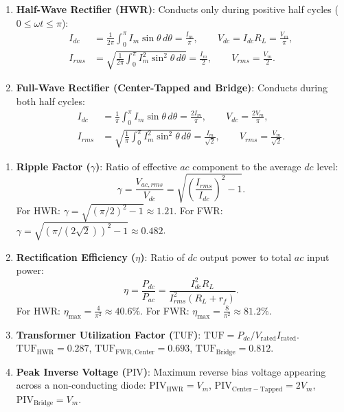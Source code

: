 \documentclass[12pt,a4paper]{article}
\begin{document}
\begin{enumerate}[leftmargin=1.5em, itemsep=3pt]
  \item \textbf{Half-Wave Rectifier (HWR)}: Conducts only during positive half cycles ($0 \le \omega t \le \pi$):
  \[
  \begin{aligned}
  I_{dc} &= \frac{1}{2\pi}\int_0^\pi I_m\sin\theta\,d\theta = \frac{I_m}{\pi},\qquad V_{dc} = I_{dc}R_L = \frac{V_m}{\pi},\\
  I_{rms} &= \sqrt{\frac{1}{2\pi}\int_0^\pi I_m^2\sin^2\theta\,d\theta} = \frac{I_m}{2},\qquad V_{rms} = \frac{V_m}{2}.
  \end{aligned}
  \]
  \item \textbf{Full-Wave Rectifier (Center-Tapped and Bridge)}: Conducts during both half cycles:
  \[
  \begin{aligned}
  I_{dc} &= \frac{1}{\pi}\int_0^\pi I_m\sin\theta\,d\theta = \frac{2I_m}{\pi},\qquad V_{dc} = \frac{2V_m}{\pi},\\
  I_{rms} &= \sqrt{\frac{1}{\pi}\int_0^\pi I_m^2\sin^2\theta\,d\theta} = \frac{I_m}{\sqrt{2}},\qquad V_{rms} = \frac{V_m}{\sqrt{2}}.
  \end{aligned}
  \]
\end{enumerate}

\begin{tcolorbox}[formulabox, title={Performance Metrics of Rectifiers}]
\begin{enumerate}[leftmargin=1.5em, itemsep=2pt]
  \item \textbf{Ripple Factor ($\gamma$)}: Ratio of effective $ac$ component to the average $dc$ level:
  \[
  \gamma = \frac{V_{ac,rms}}{V_{dc}} = \sqrt{\left(\frac{I_{rms}}{I_{dc}}\right)^2 - 1}.
  \]
  For HWR: $\gamma = \sqrt{(\pi/2)^2 - 1} \approx 1.21$. For FWR: $\gamma = \sqrt{(\pi/(2\sqrt{2}))^2 - 1} \approx 0.482$.
  \item \textbf{Rectification Efficiency ($\eta$)}: Ratio of $dc$ output power to total $ac$ input power:
  \[
  \eta = \frac{P_{dc}}{P_{ac}} = \frac{I_{dc}^2 R_L}{I_{rms}^2 (R_L + r_f)}.
  \]
  For HWR: $\eta_{\max} = \frac{4}{\pi^2} \approx 40.6\%$. For FWR: $\eta_{\max} = \frac{8}{\pi^2} \approx 81.2\%$.
  \item \textbf{Transformer Utilization Factor ($\mathrm{TUF}$)}: $\mathrm{TUF} = P_{dc} / V_{\text{rated}}I_{\text{rated}}$.
  $\mathrm{TUF}_{\mathrm{HWR}} = 0.287$, $\mathrm{TUF}_{\mathrm{FWR,Center}} = 0.693$, $\mathrm{TUF}_{\mathrm{Bridge}} = 0.812$.
  \item \textbf{Peak Inverse Voltage ($\mathrm{PIV}$)}: Maximum reverse bias voltage appearing across a non-conducting diode:
  $\mathrm{PIV}_{\mathrm{HWR}} = V_m$, $\mathrm{PIV}_{\mathrm{Center-Tapped}} = 2V_m$, $\mathrm{PIV}_{\mathrm{Bridge}} = V_m$.
\end{enumerate}
\end{tcolorbox}
\end{document}
